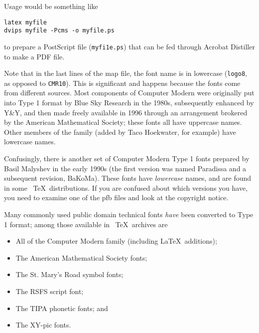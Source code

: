 Usage would be something like 

\begin{verbatim}
latex myfile 
dvips myfile -Pcms -o myfile.ps 
\end{verbatim}

to prepare a PostScript file (\verb|myfi1e.ps|) that can be fed through Acrobat Distiller 
to make a PDF file. 
 
 

Note that in the last lines of the map file, the font name is in
lowercase (\verb|logo8|, as opposed to \verb|CMR10|). This is significant and happens
because the fonts come from different sources. Most components of
Computer Modern were originally put into Type 1 format by Blue Sky
Research in the 1980s, subsequently enhanced by Y\&Y, and then made
freely available in 1996 through an arrangement brokered by the American
Mathematical Society; these fonts all have uppercase names. Other
members of the family (added by Taco Hoekwater, for example) have
lowercase names. 

Confusingly, there is another set of Computer Modern Type 1 fonts prepared by 
Basil Malyshev in the early 1990s (the first version was named Paradissa and a subsequent revision, BaKoMa). These 
fonts have \emph{lowercase} names, and are found in 
some \ \TeX\  distributions. If you are confused about which versions you have, you 
need to examine one of the pfb files and look at the copyright notice. 

Many commonly used public domain technical fonts \emph{have} been converted to 
Type 1 format; among those available in \ \TeX\  archives are 

\begin{itemize}
  \item All of the Computer Modern family (including \LaTeX\  additions); 
  \item The American Mathematical Society fonts; 
  \item The St. Mary's Road symbol fonts; 
  \item The RSFS script font; 
  \item The TIPA phonetic fonts; and 
  \item The XY-pic fonts. 
\end{itemize}
 
 
